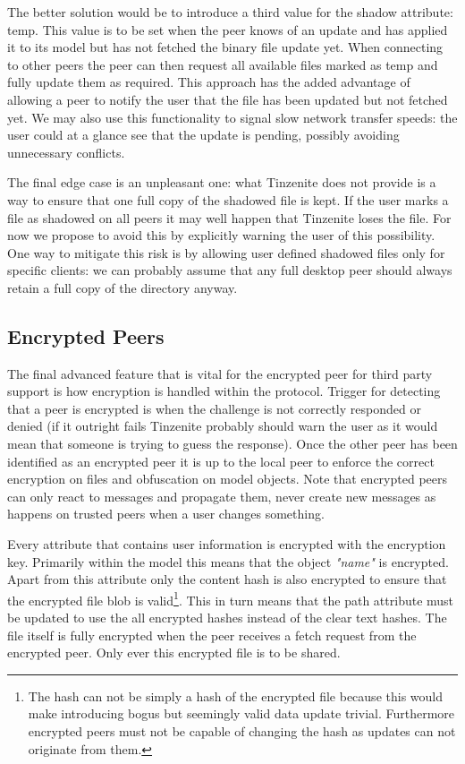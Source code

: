 The better solution would be to introduce a third value for the shadow attribute: temp.
This value is to be set when the peer knows of an update and has applied it to its model but has not fetched the binary file update yet.
When connecting to other peers the peer can then request all available files marked as temp and fully update them as required.
This approach has the added advantage of allowing a peer to notify the user that the file has been updated but not fetched yet.
We may also use this functionality to signal slow network transfer speeds: the user could at a glance see that the update is pending, possibly avoiding unnecessary conflicts.

The final edge case is an unpleasant one: what Tinzenite does not provide is a way to ensure that one full copy of the shadowed file is kept.
If the user marks a file as shadowed on all peers it may well happen that Tinzenite loses the file.
For now we propose to avoid this by explicitly warning the user of this possibility.
One way to mitigate this risk is by allowing user defined shadowed files only for specific clients: we can probably assume that any full desktop peer should always retain a full copy of the directory anyway.


\subsection{Encrypted Peers}
\label{sub:Encrypted Peers}

The final advanced feature that is vital for the encrypted peer for third party support is how encryption is handled within the protocol.
Trigger for detecting that a peer is encrypted is when the challenge is not correctly responded or denied (if it outright fails Tinzenite probably should warn the user as it would mean that someone is trying to guess the response).
Once the other peer has been identified as an encrypted peer it is up to the local peer to enforce the correct encryption on files and obfuscation on model objects.
Note that encrypted peers can only react to messages and propagate them, never create new messages as happens on trusted peers when a user changes something.


Every attribute that contains user information is encrypted with the encryption key.
Primarily within the model this means that the object \textit{"name"} is encrypted.
Apart from this attribute only the content hash is also encrypted to ensure that the encrypted file blob is valid\footnote{The hash can not be simply a hash of the encrypted file because this would make introducing bogus but seemingly valid data update trivial. Furthermore encrypted peers must not be capable of changing the hash as updates can not originate from them.}.
This in turn means that the path attribute must be updated to use the all encrypted hashes instead of the clear text hashes.
The file itself is fully encrypted when the peer receives a fetch request from the encrypted peer.
Only ever this encrypted file is to be shared.

